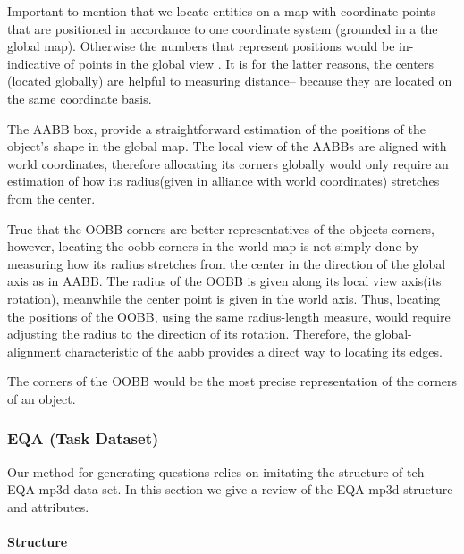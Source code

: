 Important to mention that we locate entities on a map with coordinate points that are positioned in accordance to one coordinate system (grounded in a the global map). Otherwise the numbers that represent positions would be in-indicative of points in the global view . It is for the latter reasons, the centers (located globally) are helpful to measuring distance-- because they are located on the same coordinate basis.  

The AABB box, provide a straightforward estimation of the positions of the object's shape in the global map. The local view of the AABBs are aligned with world coordinates, therefore allocating its corners globally would only require an estimation of how its radius(given in alliance with world coordinates) stretches from the center.

True that the OOBB corners are better representatives of the objects corners, however, locating the oobb corners in the world map is not simply done by measuring how its radius stretches from the center in the direction of  the global axis as in AABB. The radius of the OOBB is given along its local view axis(its rotation), meanwhile the center point is given in the world axis. Thus, locating the positions of the OOBB, using the same radius-length measure, would require adjusting the radius to the direction of its rotation. Therefore, the global-alignment characteristic of the aabb provides a direct way to locating its edges.  


The corners of the OOBB would be the most precise representation of the corners of an object. 



\subsubsection{EQA (Task Dataset)}

Our method for generating questions relies on imitating the structure of teh EQA-mp3d data-set. In this section we give a review of the EQA-mp3d structure and attributes.   

\paragraph{Structure}

